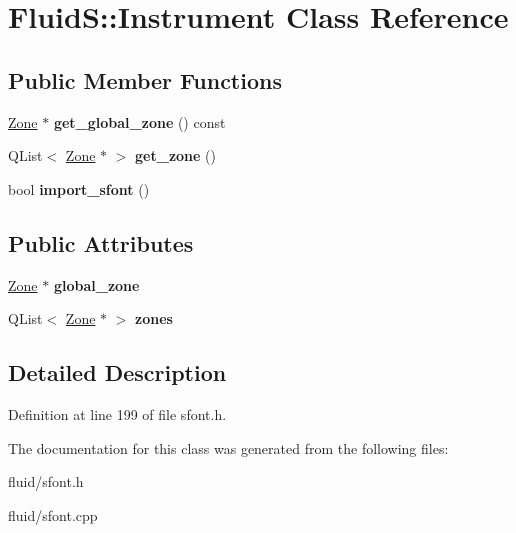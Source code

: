 \hypertarget{class_fluid_s_1_1_instrument}{}\section{FluidS\+:\+:Instrument Class Reference}
\label{class_fluid_s_1_1_instrument}
\subsection*{Public Member Functions}
\begin{DoxyCompactItemize}
\item 
\mbox{\label{class_fluid_s_1_1_instrument_a42d77f1ddf83801e8f972b279f6a88e6}} 
\hyperlink{class_fluid_s_1_1_zone}{Zone} $\ast$ {\bfseries get\+\_\+global\+\_\+zone} () const
\item 
\mbox{\label{class_fluid_s_1_1_instrument_a1dead0bf5d3415dd425836a2abc73a21}} 
Q\+List$<$ \hyperlink{class_fluid_s_1_1_zone}{Zone} $\ast$ $>$ {\bfseries get\+\_\+zone} ()
\item 
\mbox{\label{class_fluid_s_1_1_instrument_a51aa4882f53b956a45afc90e757f32b8}} 
bool {\bfseries import\+\_\+sfont} ()
\end{DoxyCompactItemize}
\subsection*{Public Attributes}
\begin{DoxyCompactItemize}
\item 
\mbox{\label{class_fluid_s_1_1_instrument_a2e7d28d760baba6481e119d6003fd3b1}} 
\hyperlink{class_fluid_s_1_1_zone}{Zone} $\ast$ {\bfseries global\+\_\+zone}
\item 
\mbox{\label{class_fluid_s_1_1_instrument_af7b4a064d7b9e1081aedbab186bca007}} 
Q\+List$<$ \hyperlink{class_fluid_s_1_1_zone}{Zone} $\ast$ $>$ {\bfseries zones}
\end{DoxyCompactItemize}


\subsection{Detailed Description}


Definition at line 199 of file sfont.\+h.



The documentation for this class was generated from the following files\+:\begin{DoxyCompactItemize}
\item 
fluid/sfont.\+h\item 
fluid/sfont.\+cpp\end{DoxyCompactItemize}

